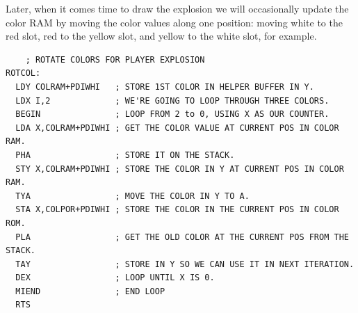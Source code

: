 Later, when it comes time to draw the explosion we will occasionally update the color RAM by moving the 
color values along one position: moving white to the red slot, red to the yellow slot, and yellow to the
white slot, for example.
\begin{lstlisting}
    ; ROTATE COLORS FOR PLAYER EXPLOSION
ROTCOL:
  LDY COLRAM+PDIWHI   ; STORE 1ST COLOR IN HELPER BUFFER IN Y.
  LDX I,2             ; WE'RE GOING TO LOOP THROUGH THREE COLORS.
  BEGIN               ; LOOP FROM 2 to 0, USING X AS OUR COUNTER.
  LDA X,COLRAM+PDIWHI ; GET THE COLOR VALUE AT CURRENT POS IN COLOR RAM.
  PHA                 ; STORE IT ON THE STACK.
  STY X,COLRAM+PDIWHI ; STORE THE COLOR IN Y AT CURRENT POS IN COLOR RAM.
  TYA                 ; MOVE THE COLOR IN Y TO A.
  STA X,COLPOR+PDIWHI ; STORE THE COLOR IN THE CURRENT POS IN COLOR ROM.
  PLA                 ; GET THE OLD COLOR AT THE CURRENT POS FROM THE STACK.
  TAY                 ; STORE IN Y SO WE CAN USE IT IN NEXT ITERATION.
  DEX                 ; LOOP UNTIL X IS 0.
  MIEND               ; END LOOP
  RTS
\end{lstlisting}

